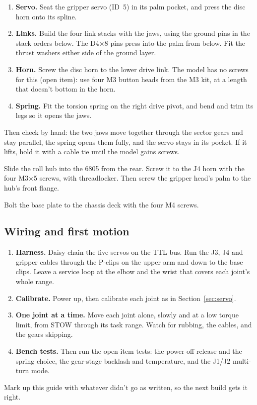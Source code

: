 \documentclass[10pt]{article}
\begin{document}
\begin{enumerate}\itemsep0pt
  \item \textbf{Servo.} Seat the gripper servo (ID~5) in its palm pocket, and press the disc horn onto its spline.
  \item \textbf{Links.} Build the four link stacks with the jaws, using the ground pins in the stack orders below. The
  D4$\times$8 pins press into the palm from below. Fit the thrust washers either side of the ground layer.
  \item \textbf{Horn.} Screw the disc horn to the lower drive link. The model has no screws for this (open item): use
  four M3 button heads from the M3 kit, at a length that doesn't bottom in the horn.
  \item \textbf{Spring.} Fit the torsion spring on the right drive pivot, and bend and trim its legs so it opens the jaws.
\end{enumerate}
Then check by hand: the two jaws move together through the sector gears and stay parallel, the spring opens them fully,
and the servo stays in its pocket. If it lifts, hold it with a cable tie until the model gains screws.
\steplater

Slide the roll hub into the 6805 from the rear. Screw it to the J4 horn with the four M3$\times$5 screws, with
threadlocker. Then screw the gripper head's palm to the hub's front flange.
\steplater

Bolt the base plate to the chassis deck with the four M4 screws.
\steplater

\subsection{Wiring and first motion}
\begin{enumerate}\itemsep0pt
  \item \textbf{Harness.} Daisy-chain the five servos on the TTL bus. Run the J3, J4 and gripper cables through the
  P-clips on the upper arm and down to the base clips. Leave a service loop at the elbow and the wrist that covers each
  joint's whole range.
  \item \textbf{Calibrate.} Power up, then calibrate each joint as in Section~\ref{sec:servo}.
  \item \textbf{One joint at a time.} Move each joint alone, slowly and at a low torque limit, from STOW through its task
  range. Watch for rubbing, the cables, and the gears skipping.
  \item \textbf{Bench tests.} Then run the open-item tests: the power-off release and the spring choice, the gear-stage
  backlash and temperature, and the J1/J2 multi-turn mode.
\end{enumerate}
Mark up this guide with whatever didn't go as written, so the next build gets it right.
\end{document}
